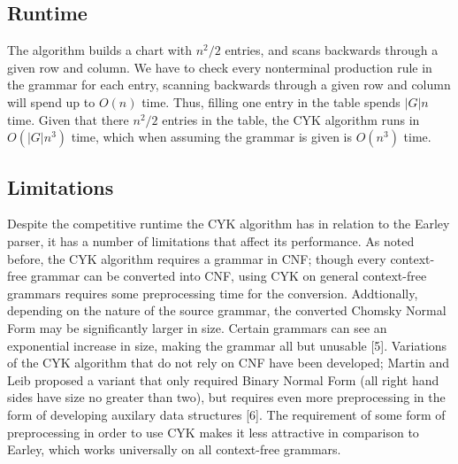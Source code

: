 \documentclass[a4paper, 11pt]{article}
\begin{document}
\begin{center}
\end{center}


\subsection{Runtime}

The algorithm builds a chart with $n^2/2$ entries, and scans backwards through a given row and column. We have to check every nonterminal production rule in the grammar for
each entry, scanning backwards through a given row and column will spend up to $O(n)$ time. Thus, filling one entry in the table spends $|G|n$ time. Given that there $n^2/2$
entries in the table, the CYK algorithm runs in $O(|G|n^3)$ time, which when assuming the grammar is given is $O(n^3)$ time.

\subsection{Limitations}
Despite the competitive runtime the CYK algorithm has in relation to the Earley parser, it has a number of limitations that affect its performance. As noted before, the CYK
algorithm requires a grammar in CNF; though every context-free grammar can be converted into CNF, using CYK on general context-free grammars requires some preprocessing
time for the conversion. Addtionally, depending on the nature of the source grammar, the converted Chomsky Normal Form may be significantly larger in size. Certain grammars
can see an exponential increase in size, making the grammar all but unusable [5]. Variations of the CYK algorithm that do not rely on CNF have been
developed; Martin and Leib proposed a variant that only required Binary Normal Form (all right hand sides have size no greater than two), but requires even more preprocessing
in the form of developing auxilary data structures [6]. The requirement of some form of preprocessing in order to use CYK makes it less attractive in comparison to Earley,
which works universally on all context-free grammars.
\end{document}
